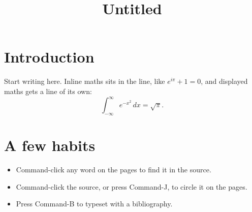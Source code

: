 \documentclass[11pt]{article}
\title{Untitled}
\author{}
\date{}
\begin{document}
\maketitle

\section{Introduction}
Start writing here. Inline maths sits in the line, like $e^{i\pi} + 1 = 0$,
and displayed maths gets a line of its own:
\begin{equation}
  \int_{-\infty}^{\infty} e^{-x^2}\,dx = \sqrt{\pi}.
\end{equation}

\section{A few habits}
\begin{itemize}
  \item Command-click any word on the pages to find it in the source.
  \item Command-click the source, or press Command-J, to circle it on the pages.
  \item Press Command-B to typeset with a bibliography.
\end{itemize}
\end{document}
